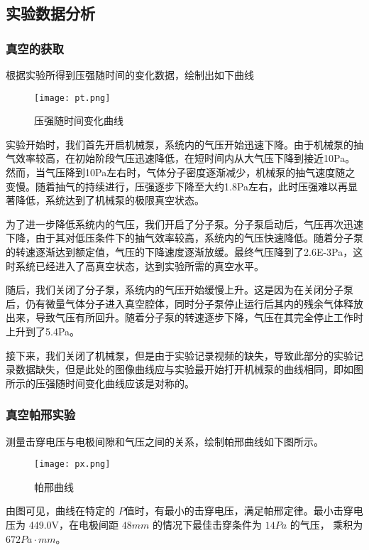 \documentclass[dvipsnames, svgnames,a4paper,11pt]{article}
\begin{document}
	\subsection{实验数据分析}
	\subsubsection{真空的获取}
	根据实验所得到压强随时间的变化数据，绘制出如下曲线
	\begin{figure}[{H}]
		\centering
		\texttt{[image: pt.png]}
		\caption{压强随时间变化曲线}
		\label{}
	\end{figure}


	实验开始时，我们首先开启机械泵，系统内的气压开始迅速下降。由于机械泵的抽气效率较高，在初始阶段气压迅速降低，在短时间内从大气压下降到接近10Pa。然而，当气压降到10Pa左右时，气体分子密度逐渐减少，机械泵的抽气速度随之变慢。随着抽气的持续进行，压强逐步下降至大约1.8Pa左右，此时压强难以再显著降低，系统达到了机械泵的极限真空状态。

为了进一步降低系统内的气压，我们开启了分子泵。分子泵启动后，气压再次迅速下降，由于其对低压条件下的抽气效率较高，系统内的气压快速降低。随着分子泵的转速逐渐达到额定值，气压的下降速度逐渐放缓。最终气压降到了2.6E-3Pa，这时系统已经进入了高真空状态，达到实验所需的真空水平。

随后，我们关闭了分子泵，系统内的气压开始缓慢上升。这是因为在关闭分子泵后，仍有微量气体分子进入真空腔体，同时分子泵停止运行后其内的残余气体释放出来，导致气压有所回升。随着分子泵的转速逐步下降，气压在其完全停止工作时上升到了5.4Pa。

接下来，我们关闭了机械泵，但是由于实验记录视频的缺失，导致此部分的实验记录数据缺失，但是此处的图像曲线应与实验最开始打开机械泵的曲线相同，即如图所示的压强随时间变化曲线应该是对称的。
	\subsubsection{真空帕邢实验}
	测量击穿电压与电极间隙和气压之间的关系，绘制帕邢曲线如下图所示。

\begin{figure}[{H}]
	\centering
	\texttt{[image: px.png]}
	\caption{帕邢曲线}
	\label{}
\end{figure}

	由图可见，曲线在特定的 $P$值时，有最小的击穿电压，满足帕邢定律。最小击穿电压为 449.0V，在电极间距 $48mm$ 的情况下最佳击穿条件为 $14Pa$ 的气压， 乘积为 $672Pa · mm$。
	
\end{document}
